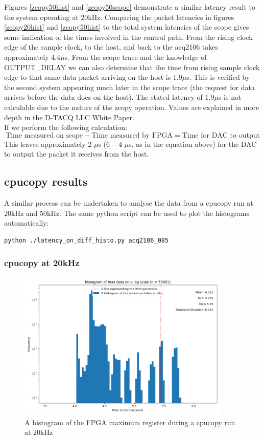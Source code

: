\documentclass{article}
\begin{document}
Figures \ref{zcopy50hist} and \ref{zcopy50scope} demonstrate a similar latency result to the system operating at 20kHz.
Comparing the packet latencies in figures \ref{zcopy20hist} and \ref{zcopy50hist} to the total system latencies of the scope gives some indication of the times involved in the control path.
From the rising clock edge of the sample clock, to the host, and back to the acq2106 takes approximately 4.4$\mu$s.
From the scope trace and the knowledge of OUTPUT\_DELAY we can also determine that the time from rising sample clock edge to that same data packet arriving on the host is 1.9$\mu$s.
This is verified by the second system appearing much later in the scope trace (the request for data arrives before the data does on the host).
The stated latency of 1.9$\mu$s is not calculable due to the nature of the zcopy operation. Values are explained in more depth in the \mbox{D-TACQ}  LLC White Paper. \\
If we perform the following calculation:
\begin{equation}
\text{Time measured on scope} - \text{Time measured by FPGA} = \text{Time for DAC to output}
\end{equation}
This leaves approximately 2 $\mu$s ($6-4$  $\mu$s, as in the equation above) for the DAC to output the packet it receives from the host.

\newpage

\subsection{cpucopy results}
A similar process can be undertaken to analyse the data from a cpucopy run at 20kHz and 50kHz.
The same python script can be used to plot the histograms automatically:

\begin{verbatim}
python ./latency_on_diff_histo.py acq2106_085
\end{verbatim}

\subsubsection{cpucopy at 20kHz}

\begin{figure} [htb!]
	\centering
	\includegraphics[width=4.0in]{images/better_images/20k_cpu.png}
	\caption{A histogram of the FPGA maximum register during a cpucopy run at 20kHz}
	\label{cpu20hist}
\end{figure}
\end{document}
